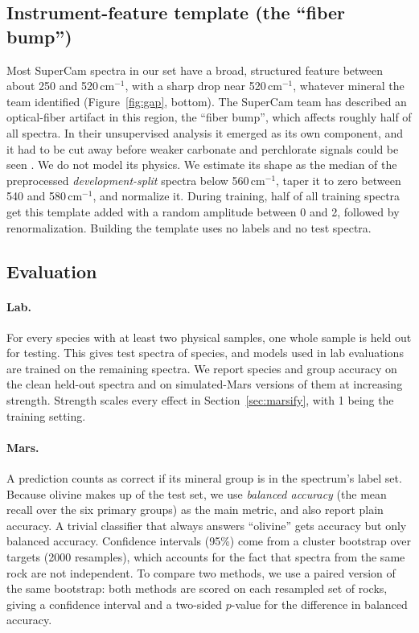 \subsection{Instrument-feature template (the ``fiber bump'')}
\label{sec:artifact}
Most SuperCam spectra in our set have a broad, structured feature between about 250 and 520\,cm$^{-1}$, with a sharp drop near 520\,cm$^{-1}$, whatever mineral the team identified (Figure~\ref{fig:gap}, bottom). The SuperCam team has described an optical-fiber artifact in this region, the ``fiber bump'', which affects roughly half of all spectra. In their unsupervised analysis it emerged as its own component, and it had to be cut away before weaker carbonate and perchlorate signals could be seen \citep{clave2024unsupervised,lopezreyes2025supercam}. We do not model its physics. We estimate its shape as the median of the preprocessed \emph{development-split} spectra below 560\,cm$^{-1}$, taper it to zero between 540 and 580\,cm$^{-1}$, and normalize it. During training, half of all training spectra get this template added with a random amplitude between 0 and 2, followed by renormalization. Building the template uses no labels and no test spectra.

\subsection{Evaluation}
\paragraph{Lab.} For every species with at least two physical samples, one whole sample is held out for testing. This gives \nLabTest{} test spectra of \nLabTestSpecies{} species, and models used in lab evaluations are trained on the remaining \nLabTrain{} spectra. We report species and group accuracy on the clean held-out spectra and on simulated-Mars versions of them at increasing strength. Strength scales every effect in Section~\ref{sec:marsify}, with 1 being the training setting.

\paragraph{Mars.} A prediction counts as correct if its mineral group is in the spectrum's label set. Because olivine makes up \pctOlivine{} of the test set, we use \emph{balanced accuracy} (the mean recall over the six primary groups) as the main metric, and also report plain accuracy. A trivial classifier that always answers ``olivine'' gets \majAcc{} accuracy but only \majBal{} balanced accuracy. Confidence intervals (95\%) come from a cluster bootstrap over targets (2000 resamples), which accounts for the fact that spectra from the same rock are not independent. To compare two methods, we use a paired version of the same bootstrap: both methods are scored on each resampled set of rocks, giving a confidence interval and a two-sided $p$-value for the difference in balanced accuracy.

